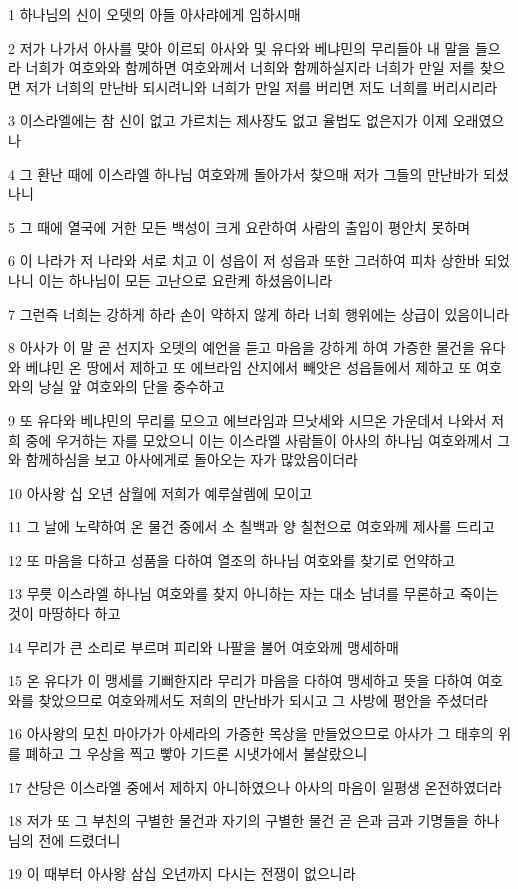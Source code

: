 \par 1 하나님의 신이 오뎃의 아들 아사랴에게 임하시매
\par 2 저가 나가서 아사를 맞아 이르되 아사와 및 유다와 베냐민의 무리들아 내 말을 들으라 너희가 여호와와 함께하면 여호와께서 너희와 함께하실지라 너희가 만일 저를 찾으면 저가 너희의 만난바 되시려니와 너희가 만일 저를 버리면 저도 너희를 버리시리라
\par 3 이스라엘에는 참 신이 없고 가르치는 제사장도 없고 율법도 없은지가 이제 오래였으나
\par 4 그 환난 때에 이스라엘 하나님 여호와께 돌아가서 찾으매 저가 그들의 만난바가 되셨나니
\par 5 그 때에 열국에 거한 모든 백성이 크게 요란하여 사람의 출입이 평안치 못하며
\par 6 이 나라가 저 나라와 서로 치고 이 성읍이 저 성읍과 또한 그러하여 피차 상한바 되었나니 이는 하나님이 모든 고난으로 요란케 하셨음이니라
\par 7 그런즉 너희는 강하게 하라 손이 약하지 않게 하라 너희 행위에는 상급이 있음이니라
\par 8 아사가 이 말 곧 선지자 오뎃의 예언을 듣고 마음을 강하게 하여 가증한 물건을 유다와 베냐민 온 땅에서 제하고 또 에브라임 산지에서 빼앗은 성읍들에서 제하고 또 여호와의 낭실 앞 여호와의 단을 중수하고
\par 9 또 유다와 베냐민의 무리를 모으고 에브라임과 므낫세와 시므온 가운데서 나와서 저희 중에 우거하는 자를 모았으니 이는 이스라엘 사람들이 아사의 하나님 여호와께서 그와 함께하심을 보고 아사에게로 돌아오는 자가 많았음이더라
\par 10 아사왕 십 오년 삼월에 저희가 예루살렘에 모이고
\par 11 그 날에 노략하여 온 물건 중에서 소 칠백과 양 칠천으로 여호와께 제사를 드리고
\par 12 또 마음을 다하고 성품을 다하여 열조의 하나님 여호와를 찾기로 언약하고
\par 13 무릇 이스라엘 하나님 여호와를 찾지 아니하는 자는 대소 남녀를 무론하고 죽이는 것이 마땅하다 하고
\par 14 무리가 큰 소리로 부르며 피리와 나팔을 불어 여호와께 맹세하매
\par 15 온 유다가 이 맹세를 기뻐한지라 무리가 마음을 다하여 맹세하고 뜻을 다하여 여호와를 찾았으므로 여호와께서도 저희의 만난바가 되시고 그 사방에 평안을 주셨더라
\par 16 아사왕의 모친 마아가가 아세라의 가증한 목상을 만들었으므로 아사가 그 태후의 위를 폐하고 그 우상을 찍고 빻아 기드론 시냇가에서 불살랐으니
\par 17 산당은 이스라엘 중에서 제하지 아니하였으나 아사의 마음이 일평생 온전하였더라
\par 18 저가 또 그 부친의 구별한 물건과 자기의 구별한 물건 곧 은과 금과 기명들을 하나님의 전에 드렸더니
\par 19 이 때부터 아사왕 삼십 오년까지 다시는 전쟁이 없으니라

